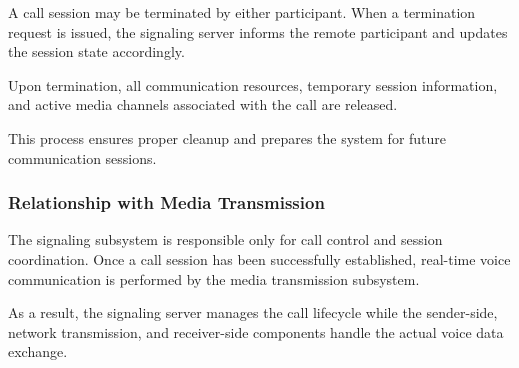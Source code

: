 A call session may be terminated by either participant. When a termination request is issued, the signaling server informs the remote participant and updates the session state accordingly.

Upon termination, all communication resources, temporary session information, and active media channels associated with the call are released.

This process ensures proper cleanup and prepares the system for future communication sessions.

\subsubsection{Relationship with Media Transmission}

The signaling subsystem is responsible only for call control and session coordination. Once a call session has been successfully established, real-time voice communication is performed by the media transmission subsystem.

As a result, the signaling server manages the call lifecycle while the sender-side, network transmission, and receiver-side components handle the actual voice data exchange.
